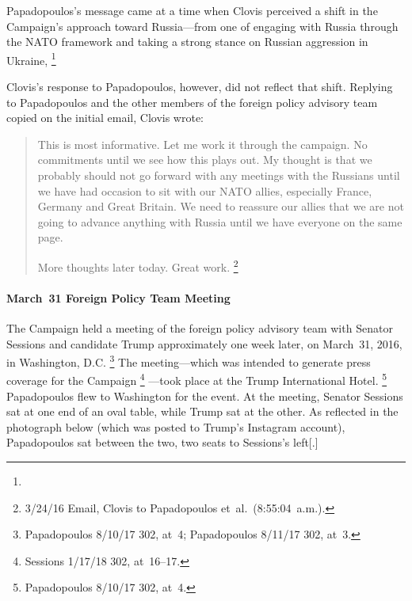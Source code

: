 Papadopoulos's message came at a time when Clovis perceived a shift in the Campaign's approach toward Russia---from one of engaging with Russia through the NATO framework and taking a strong stance on Russian aggression in Ukraine, %
\footnote{}

Clovis's response to Papadopoulos, however, did not reflect that shift.
Replying to Papadopoulos and the other members of the foreign policy advisory team copied on the initial email, Clovis wrote:

\begin{quote}
This is most informative.
Let me work it through the campaign.
No commitments until we see how this plays out.
My thought is that we probably should not go forward with any meetings with the Russians until we have had occasion to sit with our NATO allies, especially France, Germany and Great Britain.
We need to reassure our allies that we are not going to advance anything with Russia until we have everyone on the same page.

More thoughts later today.
Great work.%
\footnote{3/24/16 Email, Clovis to Papadopoulos et~al.\ (8:55:04~a.m.).}
\end{quote}

\paragraph{March~31 Foreign Policy Team Meeting}

The Campaign held a meeting of the foreign policy advisory team with Senator Sessions and candidate Trump approximately one week later, on March~31, 2016, in Washington, D.C.%
\footnote{Papadopoulos 8/10/17 302, at~4; Papadopoulos 8/11/17 302, at~3.}
The meeting---which was intended to generate press coverage for the Campaign%
\footnote{Sessions 1/17/18 302, at~16--17.}%
---took place at the Trump International Hotel.%
\footnote{Papadopoulos 8/10/17 302, at~4.}
Papadopoulos flew to Washington for the event.
At the meeting, Senator Sessions sat at one end of an oval table, while Trump sat at the other.
As reflected in the photograph below (which was posted to Trump's Instagram account), Papadopoulos sat between the two, two seats to Sessions's left[.]

